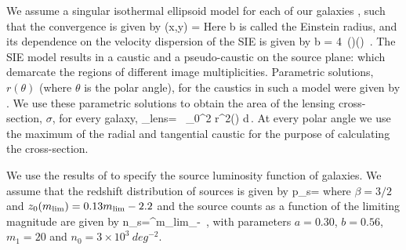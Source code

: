 \documentclass[useAMS,usenatbib,a4paper]{mn2e}
\begin{document}
%
%


We assume a singular isothermal ellipsoid model for each of our galaxies
\citep{Kormann1994}, such that the convergence is given by
\be
\kappa (x,y) = 
\ee
Here b is called the Einstein radius, and its dependence on the velocity
dispersion of the SIE is given by
\be
b = 4\pi\,
\left(\right)\left(\right) \,.
\ee
The SIE model results in a caustic and a pseudo-caustic on the source plane:
which demarcate the regions of different image multiplicities. Parametric
solutions, $r(\theta)$ (where $\theta$ is the polar angle), for the caustics in
such a model were given by \citet{Keeton2000b}. We use these parametric
solutions to obtain the area of the lensing cross-section, $\sigma$, for every
galaxy,
\be
\sigma_{\rm lens}= \, \int_0^{2\pi} r^2(\theta) d\theta\,.
\ee
At every polar angle we use the maximum of the radial and tangential caustic for
the purpose of calculating the cross-section.





We use the results of \citet{Faure2009} to specify the source luminosity
function of galaxies. We assume that the redshift distribution of sources is
given by
\be
\label{eqn:ps}
p_s=
\ee
where $\beta=3/2$ and $z_0(m_{\rm lim})=0.13m_{\rm lim} - 2.2$ and the source
counts as a function of the limiting magnitude are given by
\be
\label{eqn:ns}
n_s=\int^{m_{\rm lim}}_{-\infty} 
\,,
\ee
with parameters $a=0.30$, $b=0.56$, $m_1=20$ and $n_0=3\times10^3~deg^{-2}$.
\end{document}
